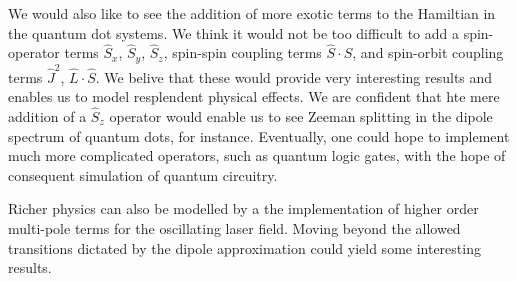We would also like to see the addition of more exotic terms to the Hamiltian in the 
quantum dot systems. We think it would not be too difficult to add a spin-operator 
terms $\hat{S}_x$, $\hat{S}_y$, $\hat{S}_z$, spin-spin coupling terms
$\hat{S}\cdot\hat{S}$, and spin-orbit
coupling terms $\hat{J}^2$, $\hat{L}\cdot\hat{S}$. We belive that these would provide 
very interesting results and enables us to model resplendent physical effects. We are 
confident that hte 
mere addition of a $\hat{S}_z$ operator would enable us to see Zeeman splitting in 
the dipole spectrum of quantum dots, for instance. Eventually, one could hope to 
implement much more complicated operators, such as quantum logic gates, with the 
hope of consequent simulation of quantum circuitry.

Richer physics can also be modelled by a the implementation of higher order 
multi-pole terms for the oscillating laser field. Moving beyond the allowed transitions
dictated by the dipole approximation could yield some interesting results.
